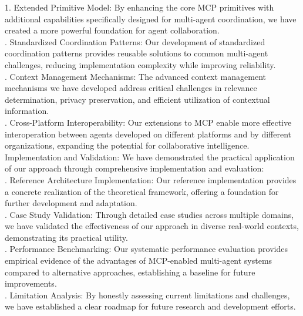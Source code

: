 1. Extended Primitive Model: By enhancing the core MCP primitives with additional capabilities specifically designed for multi-agent coordination, we have created a more powerful foundation for agent collaboration.\\ . Standardized Coordination Patterns: Our development of standardized coordination patterns provides reusable solutions to common multi-agent challenges, reducing implementation complexity while improving reliability.\\ . Context Management Mechanisms: The advanced context management mechanisms we have developed address critical challenges in relevance determination, privacy preservation, and efficient utilization of contextual information.\\ . Cross-Platform Interoperability: Our extensions to MCP enable more effective interoperation between agents developed on different platforms and by different organizations, expanding the potential for collaborative intelligence.\\ \newline
Implementation and Validation: We have demonstrated the practical application of our approach through comprehensive implementation and evaluation:\\ . Reference Architecture Implementation: Our reference implementation provides a concrete realization of the theoretical framework, offering a foundation for further development and adaptation.\\ . Case Study Validation: Through detailed case studies across multiple domains, we have validated the effectiveness of our approach in diverse real-world contexts, demonstrating its practical utility.\\ . Performance Benchmarking: Our systematic performance evaluation provides empirical evidence of the advantages of MCP-enabled multi-agent systems compared to alternative approaches, establishing a baseline for future improvements.\\ . Limitation Analysis: By honestly assessing current limitations and challenges, we have established a clear roadmap for future research and development efforts.\\ \newline
